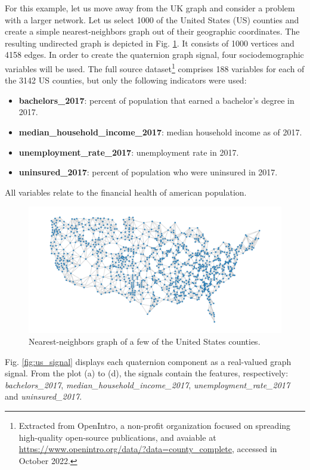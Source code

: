 For this example, let us move away from the UK graph and consider a problem with a larger network. Let us select 1000 of the United States (US) counties and create a simple nearest-neighbors graph out of their geographic coordinates. The resulting undirected graph is depicted in Fig. \ref{fig:us_graph}. It consists of 1000 vertices and 4158 edges. In order to create the quaternion graph signal, four sociodemographic variables will be used. The full source dataset\footnote{Extracted from OpenIntro, a non-profit organization focused on spreading high-quality open-source publications, and avaiable at \url{https://www.openintro.org/data/?data=county_complete}, accessed in October 2022.} comprises 188 variables for each of the 3142 US counties, but only the following indicators were used:
\begin{itemize}[noitemsep]
    \item \textbf{bachelors\_2017}: percent of population that earned a bachelor's degree in 2017.
    \item \textbf{median\_household\_income\_2017}: median household income as of 2017.
    \item \textbf{unemployment\_rate\_2017}: unemployment rate in 2017.
    \item \textbf{uninsured\_2017}: percent of population who were uninsured in 2017.
\end{itemize}
All variables relate to the financial health of american population.

\begin{figure}
    \centering
    \includegraphics[width=0.8\linewidth]{Figures/usa_example/us_graph.pdf}
    \caption{Nearest-neighbors graph of a few of the United States counties.}
    \label{fig:us_graph}
\end{figure}

Fig. \ref{fig:us_signal} displays each quaternion component as a real-valued graph signal. From the plot (a) to (d), the signals contain the features, respectively: \textit{bachelors\_2017}, \textit{median\_\-household\_\-income\_2017}, \textit{unemployment\_rate\_2017} and \textit{uninsured\_2017}.

